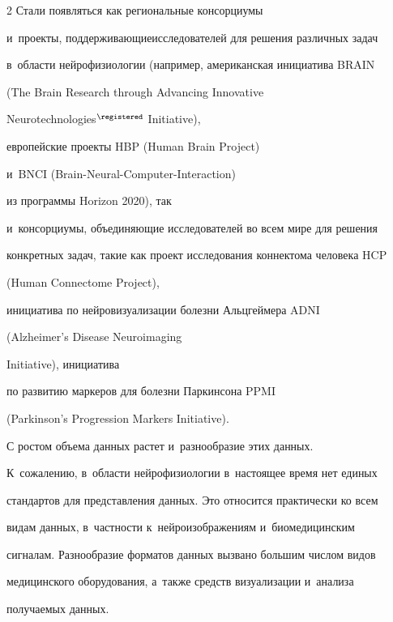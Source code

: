 \begin{multicols}{2}
Стали появляться как региональные консорциумы 


и~проекты, поддерживающие\linebreak исследователей для решения различных задач 


в~об\-ласти нейрофизиологии (например, американская инициатива BRAIN


(The Brain Research through Advancing Innovative 


Neurotechnologies$^\registered$ Initiative), 


европейские проекты HBP (Human Brain Project)


и~BNCI (Brain-Neural-Computer-Interaction)


из программы Horizon 2020), так 


и~консорциумы, объединяющие исследователей во всем мире для решения 


конкретных задач, такие как проект исследования коннектома человека HCP


(Human Connectome Project), 


инициатива по нейровизуализации болезни Альцгеймера ADNI


(Alzheimer's Disease Neuroimaging 


Initiative), инициатива 


по развитию маркеров для болезни Паркинсона PPMI


(Parkinson's Progression Markers Initiative).


{





} 


    


    С ростом объема данных растет и~разнообразие этих данных. 


К~сожалению, в~об\-ласти нейрофизиологии в~настоящее время нет единых 


стандартов для пред\-став\-ле\-ния данных. Это относится практически ко всем 


видам данных, в~част\-ности к~нейроизображениям и~биомедицинским 


сигналам. Разнообразие форматов данных вызвано большим чис\-лом видов 


медицинского оборудования, а~также средств визуализации и~анализа 


получаемых данных.


{





}
\end{multicols}
